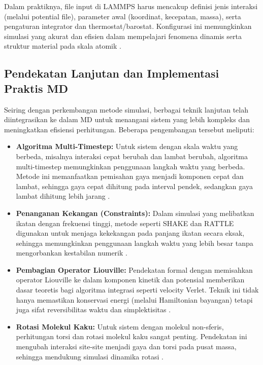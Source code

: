 Dalam praktiknya, file input di LAMMPS harus mencakup definisi jenis interaksi (melalui potential file), parameter awal (koordinat, kecepatan, massa), serta pengaturan integrator dan thermostat/barostat. Konfigurasi ini memungkinkan simulasi yang akurat dan efisien dalam mempelajari fenomena dinamis serta struktur material pada skala atomik \citep{plimpton_fast_1995}.

\subsection{Pendekatan Lanjutan dan Implementasi Praktis MD}
Seiring dengan perkembangan metode simulasi, berbagai teknik lanjutan telah diintegrasikan ke dalam MD untuk menangani sistem yang lebih kompleks dan meningkatkan efisiensi perhitungan. Beberapa pengembangan tersebut meliputi:
\begin{itemize}
    \item \textbf{Algoritma Multi-Timestep:} Untuk sistem dengan skala waktu yang berbeda, misalnya interaksi cepat berubah dan lambat berubah, algoritma multi-timestep memungkinkan penggunaan langkah waktu yang berbeda. Metode ini memanfaatkan pemisahan gaya menjadi komponen cepat dan lambat, sehingga gaya cepat dihitung pada interval pendek, sedangkan gaya lambat dihitung lebih jarang \citep{allen_introduction_2004}.
    \item \textbf{Penanganan Kekangan (Constraints):} Dalam simulasi yang melibatkan ikatan dengan frekuensi tinggi, metode seperti SHAKE dan RATTLE digunakan untuk menjaga kekekangan pada panjang ikatan secara eksak, sehingga memungkinkan penggunaan langkah waktu yang lebih besar tanpa mengorbankan kestabilan numerik \citep{allen_introduction_2004}.
    \item \textbf{Pembagian Operator Liouville:} Pendekatan formal dengan memisahkan operator Liouville ke dalam komponen kinetik dan potensial memberikan dasar teoretis bagi algoritma integrasi seperti velocity Verlet. Teknik ini tidak hanya memastikan konservasi energi (melalui Hamiltonian bayangan) tetapi juga sifat reversibilitas waktu dan simplektisitas \citep{allen_introduction_2004}.
    \item \textbf{Rotasi Molekul Kaku:} Untuk sistem dengan molekul non-sferis, perhitungan torsi dan rotasi molekul kaku sangat penting. Pendekatan ini mengubah interaksi site-site menjadi gaya dan torsi pada pusat massa, sehingga mendukung simulasi dinamika rotasi \citep{allen_introduction_2004}.
\end{itemize}

